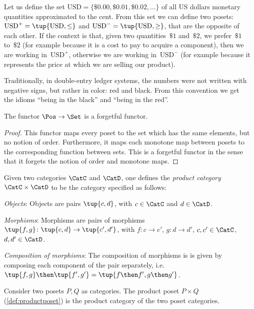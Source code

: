 \begin{example}
   Let us define the set $\text{USD}=\{\$0.00,\$0.01,\$0.02,\dots\}$
   of all US dollars monetary quantities approximated to the cent.
   From this set we can define two posets: $\text{USD}^{+} = \tup{\text{USD}, \leq}$ and $\text{USD}^{-} = \tup{\text{USD}, \geq}$, that are the opposite of each other.
   If the context is that, given two quantities~$\$1$ and~$\$2$,
   we prefer~$\$1$ to~$\$2$ (for example because it is a cost to pay to acquire a component), then we are working in~$\text{USD}^{+}$,
   otherwise we are working in~$\text{USD}^{-}$ (for example
   because it represents the price at which we are selling our product).

   Traditionally, in double-entry ledger systems, the numbers were not
   written with negative signs, but rather in color: red and black.
   From this convention we get the idioms ``being in the black''
   and ``being in the red''.
\end{example}

\begin{lemma}
The functor $\Pos \to \Set$ is a forgetful functor.
\end{lemma}
\begin{proof}
This functor maps every poset to the set which has the same elements, but no notion of order. Furthermore, it maps each monotone map between posets to the corresponding function between sets. This is a forgetful functor in the sense that it forgets the notion of order and monotone maps.
\end{proof}

\begin{shaded}
\begin{definition}
Given two categories $\CatC$ and $\CatD$, one defines the \emph{product category} $\CatC \times \CatD$ to be the category specified as follows:
\begin{compactenum}
    \item \emph{Objects}: Objects are pairs $\tup{c,d}$, with $c\in \CatC$ and $d\in \CatD$.
    \item \emph{Morphisms}: Morphisms are pairs of morphisms $\tup{f,g}\colon \tup{c,d}\to \tup{c',d'}$, with $f\colon c\to c'$, $g\colon d\to d'$, $c,c'\in \CatC$, $d,d'\in \CatD$.
    \item \emph{Composition of morphisms}: The composition of morphisms is is given by composing each component of the pair separately, i.e. $\tup{f,g}\then \tup{f',g'}=\tup{f\then f',g\then g'}$. 
\end{compactenum}
\end{definition}
\end{shaded}
\begin{example}
Consider two posets $P,Q$ as categories. The product poset $P\times Q$ (\cref{def:productposet}) is the product category of the two poset categories.
\end{example}

